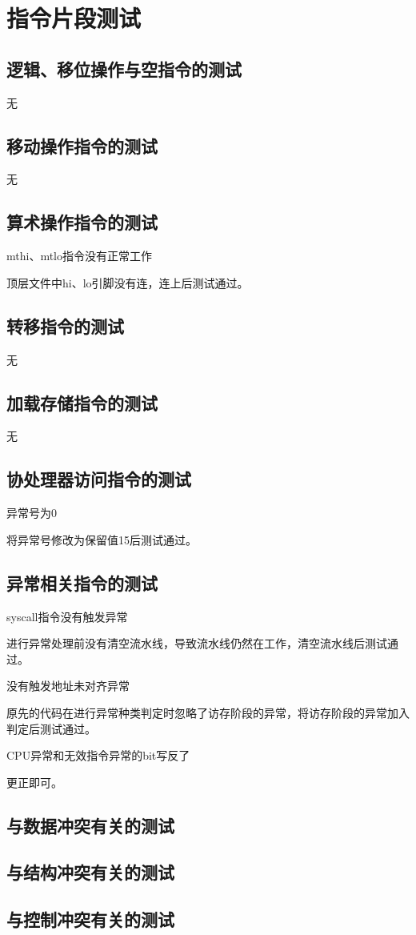 \section{指令片段测试}
\subsection{逻辑、移位操作与空指令的测试}
无

\subsection{移动操作指令的测试}
无

\subsection{算术操作指令的测试}
mthi、mtlo指令没有正常工作

顶层文件中hi、lo引脚没有连，连上后测试通过。

\subsection{转移指令的测试}
无

\subsection{加载存储指令的测试}
无

\subsection{协处理器访问指令的测试}
异常号为0

将异常号修改为保留值15后测试通过。

\subsection{异常相关指令的测试}
syscall指令没有触发异常

进行异常处理前没有清空流水线，导致流水线仍然在工作，清空流水线后测试通过。

没有触发地址未对齐异常

原先的代码在进行异常种类判定时忽略了访存阶段的异常，将访存阶段的异常加入判定后测试通过。

\quad

CPU异常和无效指令异常的bit写反了

更正即可。

\subsection{与数据冲突有关的测试}
\subsection{与结构冲突有关的测试}
\subsection{与控制冲突有关的测试}
